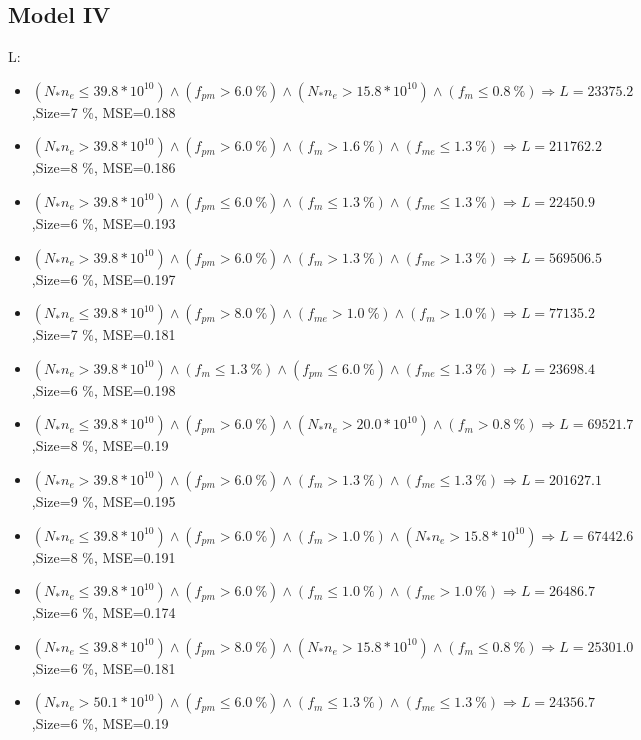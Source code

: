 \documentclass[numbered]{CSL}
\begin{document}
\subsection{Model IV}
L:
\begin{itemize}
\item $(N_* n_e \leq 39.8 * 10^{10}) \land (f_{pm} > 6.0~\%) \land (N_* n_e > 15.8 * 10^{10}) \land (f_m \leq 0.8~\%) \Rightarrow L = 23375.2$,\hfill Size=7 \%, MSE=0.188
\item $(N_* n_e > 39.8 * 10^{10}) \land (f_{pm} > 6.0~\%) \land (f_m > 1.6~\%) \land (f_{me} \leq 1.3~\%) \Rightarrow L = 211762.2$,\hfill Size=8 \%, MSE=0.186
\item $(N_* n_e > 39.8 * 10^{10}) \land (f_{pm} \leq 6.0~\%) \land (f_m \leq 1.3~\%) \land (f_{me} \leq 1.3~\%) \Rightarrow L = 22450.9$,\hfill Size=6 \%, MSE=0.193
\item $(N_* n_e > 39.8 * 10^{10}) \land (f_{pm} > 6.0~\%) \land (f_m > 1.3~\%) \land (f_{me} > 1.3~\%) \Rightarrow L = 569506.5$,\hfill Size=6 \%, MSE=0.197
\item $(N_* n_e \leq 39.8 * 10^{10}) \land (f_{pm} > 8.0~\%) \land (f_{me} > 1.0~\%) \land (f_m > 1.0~\%) \Rightarrow L = 77135.2$,\hfill Size=7 \%, MSE=0.181
\item $(N_* n_e > 39.8 * 10^{10}) \land (f_m \leq 1.3~\%) \land (f_{pm} \leq 6.0~\%) \land (f_{me} \leq 1.3~\%) \Rightarrow L = 23698.4$,\hfill Size=6 \%, MSE=0.198
\item $(N_* n_e \leq 39.8 * 10^{10}) \land (f_{pm} > 6.0~\%) \land (N_* n_e > 20.0 * 10^{10}) \land (f_m > 0.8~\%) \Rightarrow L = 69521.7$,\hfill Size=8 \%, MSE=0.19
\item $(N_* n_e > 39.8 * 10^{10}) \land (f_{pm} > 6.0~\%) \land (f_m > 1.3~\%) \land (f_{me} \leq 1.3~\%) \Rightarrow L = 201627.1$,\hfill Size=9 \%, MSE=0.195
\item $(N_* n_e \leq 39.8 * 10^{10}) \land (f_{pm} > 6.0~\%) \land (f_m > 1.0~\%) \land (N_* n_e > 15.8 * 10^{10}) \Rightarrow L = 67442.6$,\hfill Size=8 \%, MSE=0.191
\item $(N_* n_e \leq 39.8 * 10^{10}) \land (f_{pm} > 6.0~\%) \land (f_m \leq 1.0~\%) \land (f_{me} > 1.0~\%) \Rightarrow L = 26486.7$,\hfill Size=6 \%, MSE=0.174
\item $(N_* n_e \leq 39.8 * 10^{10}) \land (f_{pm} > 8.0~\%) \land (N_* n_e > 15.8 * 10^{10}) \land (f_m \leq 0.8~\%) \Rightarrow L = 25301.0$,\hfill Size=6 \%, MSE=0.181
\item $(N_* n_e > 50.1 * 10^{10}) \land (f_{pm} \leq 6.0~\%) \land (f_m \leq 1.3~\%) \land (f_{me} \leq 1.3~\%) \Rightarrow L = 24356.7$,\hfill Size=6 \%, MSE=0.19

\end{itemize}
\end{document}
